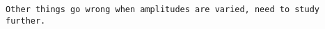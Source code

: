 \documentclass[aip,jcp,graphicx,draft]{revtex4-1}
\begin{document}
{\tt Other things go wrong when amplitudes are varied, need to study further.}

\subsection{}
\subsubsection{}


%
%

%



\end{document}
